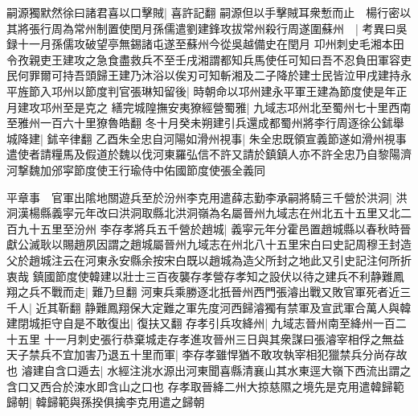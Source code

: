 嗣源獨默然徐曰諸君喜以口擊賊|{
	喜許記翻}
嗣源但以手擊賊耳衆慙而止　楊行密以其將張行周為常州制置使閏月孫儒遣劉建鋒攻拔常州殺行周遂圍蘇州　|{
	考異曰吳録十一月孫儒攻破望亭無錫諸屯遂至蘇州今從吳越備史在閏月}
卭州刺史毛湘本田令孜親吏王建攻之急食盡救兵不至壬戌湘謂都知兵馬使任可知曰吾不忍負田軍容吏民何罪爾可持吾頭歸王建乃沐浴以俟刃可知斬湘及二子降於建士民皆泣甲戌建持永平旌節入邛州以節度判官張琳知留後|{
	時朝命以邛州建永平軍王建為節度使是年正月建攻邛州至是克之}
繕完城隍撫安夷獠經營蜀雅|{
	九域志邛州北至蜀州七十里西南至雅州一百六十里獠魯皓翻}
冬十月癸未朔建引兵還成都蜀州將李行周逐徐公鉥舉城降建|{
	鉥辛律翻}
乙酉朱全忠自河陽如滑州視事|{
	朱全忠既領宣義節遂如滑州視事}
遣使者請糧馬及假道於魏以伐河東羅弘信不許又請於鎮鎮人亦不許全忠乃自黎陽濟河撃魏加邠寜節度使王行瑜侍中佑國節度使張全義同

平章事　官軍出隂地關遊兵至於汾州李克用遣薛志勤李承嗣將騎三千營於洪洞|{
	洪洞漢楊縣義寜元年改曰洪洞取縣北洪洞嶺為名屬晉州九域志在州北五十五里又北二百九十五里至汾州}
李存孝將兵五千營於趙城|{
	義寜元年分霍邑置趙城縣以春秋時晉獻公滅耿以賜趙夙因謂之趙城屬晉州九域志在州北八十五里宋白曰史記周穆王封造父於趙城注云在河東永安縣余按宋白既以趙城為造父所封之地此又引史記注何所折衷哉}
鎮國節度使韓建以壯士三百夜襲存孝營存孝知之設伏以待之建兵不利静難鳳翔之兵不戰而走|{
	難乃旦翻}
河東兵乘勝逐北扺晉州西門張濬出戰又敗官軍死者近三千人|{
	近其靳翻}
静難鳳翔保大定難之軍先度河西歸濬獨有禁軍及宣武軍合萬人與韓建閉城拒守自是不敢復出|{
	復扶又翻}
存孝引兵攻絳州|{
	九域志晉州南至絳州一百二十五里}
十一月刺史張行恭棄城走存孝進攻晉州三日與其衆謀曰張濬宰相俘之無益天子禁兵不宜加害乃退五十里而軍|{
	李存孝雖悍猶不敢攻執宰相犯獵禁兵分尚存故也}
濬建自含口遁去|{
	水經注洮水源出河東聞喜縣清襄山其水東逕大嶺下西流出謂之含口又西合於涑水即含山之口也}
存孝取晉絳二州大掠慈隰之境先是克用遣韓歸範歸朝|{
	韓歸範與孫揆俱擒李克用遣之歸朝}
